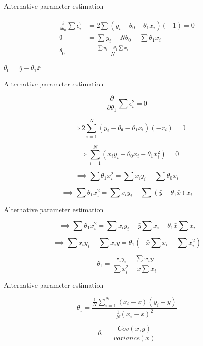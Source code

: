 \documentclass{beamer}
\begin{document}
\begin{frame}{Alternative parameter estimation}

\begin{align}
    \begin{split}
        \frac{\partial}{\partial \theta_{0}}\sum \epsilon_{i}^{2} &= 2\sum(y_{i} -  \theta_{0} - \theta_{1}x_{i})(-1) = 0 \\
        0 &= \sum y_{i} -  N\theta_{0} - \sum \theta_{1}x_{i}\\
        \theta_{0} &= \frac{\sum y_{i} - \theta_{1}\sum x_{i}}{N}
    \end{split}
\end{align}


\begin{tcolorbox}
\begin{center}
    $ \theta_{0} = \bar{y} - \theta_{1} \bar{x}$
\end{center}
\end{tcolorbox}
\end{frame}
\begin{frame}{Alternative parameter estimation}

$$
\frac{\partial}{\partial \theta_{1}}\sum \epsilon_{i}^{2} = 0
$$


$$
\implies 2 \sum_{i=1}^{N} (y_{i} - \theta_{0} - \theta_{1}x_{i})(-x_{i}) = 0
$$

$$
\implies \sum_{i=1}^{N} (x_{i}y_{i} - \theta_{0}x_{i} - \theta_{1}x_{i}^{2}) = 0
$$

$$
\implies \sum  \theta_{1}x_{i}^{2} = \sum x_{i}y_{i} - \sum \theta_{0}x_{i}
$$

$$
\implies \sum  \theta_{1}x_{i}^{2} = \sum x_{i}y_{i} - \sum (\bar{y} - \theta_{1}\bar{x})x_i
$$


\end{frame}

\begin{frame}{Alternative parameter estimation}

$$
\implies \sum  \theta_{1}x_{i}^{2} = \sum x_{i}y_{i} - \bar{y}\sum x_{i} + \theta_{1}\bar{x}\sum x_{i} 
$$

$$
\implies \sum  
x_{i}y_{i} - \sum x_{i}y = \theta_{1} (-\bar{x}\sum x_{i} + \sum x_{i}^{2})
$$

$$
\theta_{1} = \frac{x_{i}y_{i} - \sum x_{i}y}{\sum x_{i}^{2} -\bar{x}\sum x_{i}}
$$

    
\end{frame}

\begin{frame}{Alternative parameter estimation}
    
    $$
    \theta_{1} = \frac{ \frac{1}{N} \sum_{i=1}^{N}(x_{i} - \bar{x})(y_{i} - \bar{y})}{\frac{1}{N}(x_{i} - \bar{x})^{2}}
    $$
    
    \begin{tcolorbox}
    
    $$
    \theta_{1} = \frac{Cov(x,y)}{variance(x)}
    $$
    \end{tcolorbox}
\end{frame}
        
\end{document}
